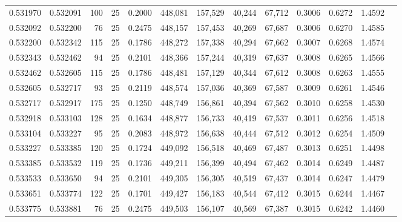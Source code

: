 \begin{tabular}{rrrrrrrrrrrrr}
0.531970 & 0.532091 &   100 &  25 &                                     0.2000 & 448,081 & 157,529 &  40,244 &  67,712 & 0.3006 & 0.6272 & 1.4592 \\
0.532092 & 0.532200 &    76 &  25 &                                     0.2475 & 448,157 & 157,453 &  40,269 &  67,687 & 0.3006 & 0.6270 & 1.4585 \\
0.532200 & 0.532342 &   115 &  25 &                                     0.1786 & 448,272 & 157,338 &  40,294 &  67,662 & 0.3007 & 0.6268 & 1.4574 \\
0.532343 & 0.532462 &    94 &  25 &                                     0.2101 & 448,366 & 157,244 &  40,319 &  67,637 & 0.3008 & 0.6265 & 1.4566 \\
0.532462 & 0.532605 &   115 &  25 &                                     0.1786 & 448,481 & 157,129 &  40,344 &  67,612 & 0.3008 & 0.6263 & 1.4555 \\
0.532605 & 0.532717 &    93 &  25 &                                     0.2119 & 448,574 & 157,036 &  40,369 &  67,587 & 0.3009 & 0.6261 & 1.4546 \\
0.532717 & 0.532917 &   175 &  25 &                                     0.1250 & 448,749 & 156,861 &  40,394 &  67,562 & 0.3010 & 0.6258 & 1.4530 \\
0.532918 & 0.533103 &   128 &  25 &                                     0.1634 & 448,877 & 156,733 &  40,419 &  67,537 & 0.3011 & 0.6256 & 1.4518 \\
0.533104 & 0.533227 &    95 &  25 &                                     0.2083 & 448,972 & 156,638 &  40,444 &  67,512 & 0.3012 & 0.6254 & 1.4509 \\
0.533227 & 0.533385 &   120 &  25 &                                     0.1724 & 449,092 & 156,518 &  40,469 &  67,487 & 0.3013 & 0.6251 & 1.4498 \\
0.533385 & 0.533532 &   119 &  25 &                                     0.1736 & 449,211 & 156,399 &  40,494 &  67,462 & 0.3014 & 0.6249 & 1.4487 \\
0.533533 & 0.533650 &    94 &  25 &                                     0.2101 & 449,305 & 156,305 &  40,519 &  67,437 & 0.3014 & 0.6247 & 1.4479 \\
0.533651 & 0.533774 &   122 &  25 &                                     0.1701 & 449,427 & 156,183 &  40,544 &  67,412 & 0.3015 & 0.6244 & 1.4467 \\
0.533775 & 0.533881 &    76 &  25 &                                     0.2475 & 449,503 & 156,107 &  40,569 &  67,387 & 0.3015 & 0.6242 & 1.4460 \\

\end{tabular}
